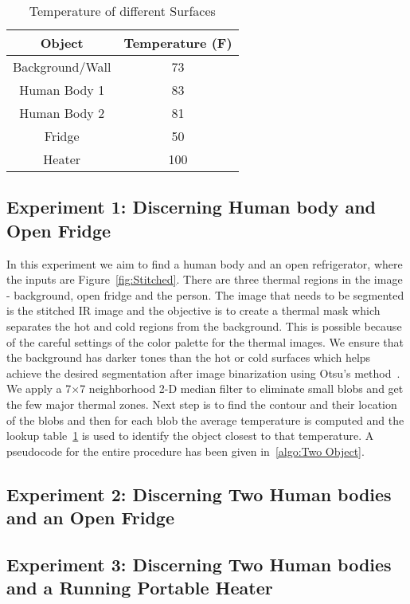\begin{table}[h!]
\centering
 \begin{tabular}{||c | c ||}
 \hline
 Object & Temperature (F)\\ [0.5ex]
 \hline\hline
 Background/Wall & 73 \\
 \hline
 Human Body 1 & 83 \\
 \hline
 Human Body 2 & 81 \\
 \hline
 Fridge & 50 \\
 \hline
 Heater & 100 \\ [1ex]
 \hline
 \end{tabular}
 \label{table:temp}
\caption{Temperature of different Surfaces}
\end{table}

    \subsection{Experiment 1: Discerning Human body and Open Fridge} In this experiment we aim to find a human body and an open refrigerator, where the inputs are Figure~\ref{fig:Stitched}. There are three thermal regions in the image - background, open fridge and the person. The image that needs to be segmented is the stitched IR image and the objective is to create a thermal mask which separates the hot and cold regions from the background. This is possible because of the careful settings of the color palette for the thermal images. We ensure that the background has darker tones than the hot or cold surfaces which helps achieve the desired segmentation after image binarization using Otsu's method~\cite{Otsu}. We apply a 7$\times$7 neighborhood 2-D median filter to eliminate small blobs and get the few major thermal zones. Next step is to find the contour and their location of the blobs and then for each blob the average temperature is computed and the lookup table~\ref{table:temp} is used to identify the object closest to that temperature. A pseudocode for the entire procedure has been given in~\ref{algo:Two Object}.




\begin{figure*}[!htp]
\begin{minipage}{0.01\textwidth}
\begin{center}
\end{center}
\end{minipage}
\begin{minipage}{1.2\textwidth}
\begin{center}
\end{center}
\end{minipage}
\caption{Stitched Image: Fridge and Human body}
\label{fig:Stitched}
\end{figure*}



\subsection{Experiment 2: Discerning Two Human bodies and an Open Fridge}
\subsection{Experiment 3: Discerning Two Human bodies and a Running Portable Heater}
